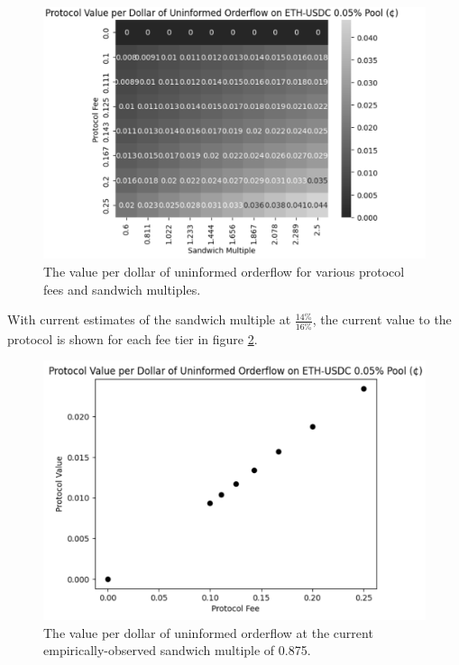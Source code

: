     \begin{figure}
        \label{fig:proto-value-per-dollar-many-sandwich-multiple}
        \centering
        \includegraphics[scale=.43]{figs/protocol-value-per-orderflow-dollar.png}
        \caption{The value per dollar of uninformed orderflow for various protocol fees and sandwich multiples.}
    \end{figure}

    With current estimates of the sandwich multiple at $\frac{14\%}{16\%}$, the current value to the protocol is shown for each fee tier in figure \ref{fig:proto-value-per-dollar-current}.

    \begin{figure}
        \label{fig:proto-value-per-dollar-current}
        \centering
        \includegraphics[scale=.43]{figs/protocol-value-vs-fee-current.png}
        \caption{The value per dollar of uninformed orderflow at the current empirically-observed sandwich multiple of 0.875.}
    \end{figure}

